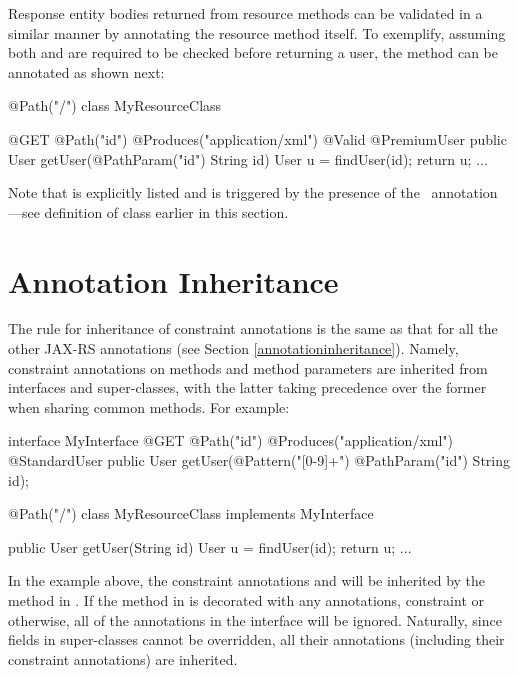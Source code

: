 Response entity bodies returned from resource methods can be validated in a similar manner by annotating the resource method itself. To exemplify, assuming both  and  are required to be checked before returning a user, the  method can be annotated as shown next:

\begin{listing}{1}
@Path("/")
class MyResourceClass {

  @GET
  @Path("{id}")
  @Produces("application/xml")
  @Valid @PremiumUser
  public User getUser(@PathParam("id") String id) {
    User u = findUser(id);
    return u;
  }
  ...
}
\end{listing}

Note that  is explicitly listed and  is triggered by the presence of the \Valid\ annotation ---see definition of  class earlier in this section.

\section{Annotation Inheritance}

The rule for inheritance of constraint annotations is the same as that for all the other JAX-RS annotations (see Section \ref{annotationinheritance}). Namely, constraint annotations on methods and method parameters are inherited from interfaces and super-classes, with the latter taking precedence over the former when sharing common methods. For example:

\begin{listing}{1}
interface MyInterface {
  @GET
  @Path("{id}")
  @Produces("application/xml")
  @StandardUser
  public User getUser(@Pattern("[0-9]+") @PathParam("id") String id);
}

@Path("/")
class MyResourceClass implements MyInterface {

  public User getUser(String id) {
    User u = findUser(id);
    return u;
  }
  ...
}
\end{listing}

In the example above, the constraint annotations  and  will be inherited by the  method in . If the  method in  is decorated with any annotations, constraint or otherwise, all of the annotations in the interface  will be ignored. Naturally, since fields in super-classes cannot be overridden, all their annotations (including their constraint annotations) are inherited.

